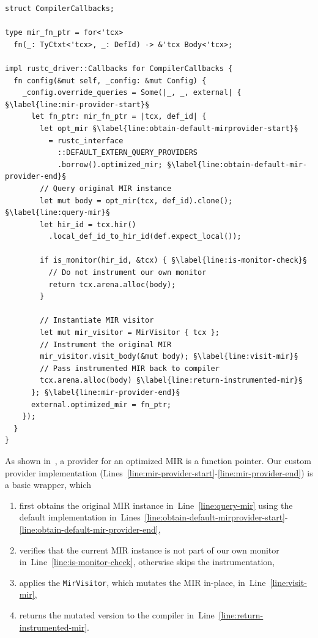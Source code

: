 \documentclass[paper=a4,%
  twoside,%
  BCOR4mm,%
  abstract=true,%
  toc=bibliography,%
  chapterprefix=true,%
  toc=bibliographynumbered,%
  open=right,%
  english,%
  pagesize=pdftex]{scrreprt}
\newcommand{\mir}{\ac{MIR}\xspace}
\begin{document}
\begin{lstlisting}[style=boxed, caption={The Rust compiler interface accepts an object which implements its callback trait, allowing us to execute code at different compilation phases}, label=lst:compiler-callbacks, escapechar=§]
struct CompilerCallbacks;

type mir_fn_ptr = for<'tcx>
  fn(_: TyCtxt<'tcx>, _: DefId) -> &'tcx Body<'tcx>;

impl rustc_driver::Callbacks for CompilerCallbacks {
  fn config(&mut self, _config: &mut Config) {
    _config.override_queries = Some(|_, _, external| { §\label{line:mir-provider-start}§
      let fn_ptr: mir_fn_ptr = |tcx, def_id| {
        let opt_mir §\label{line:obtain-default-mirprovider-start}§
          = rustc_interface
            ::DEFAULT_EXTERN_QUERY_PROVIDERS
            .borrow().optimized_mir; §\label{line:obtain-default-mir-provider-end}§
        // Query original MIR instance
        let mut body = opt_mir(tcx, def_id).clone(); §\label{line:query-mir}§
        let hir_id = tcx.hir()
          .local_def_id_to_hir_id(def.expect_local());

        if is_monitor(hir_id, &tcx) { §\label{line:is-monitor-check}§
          // Do not instrument our own monitor
          return tcx.arena.alloc(body);
        }

        // Instantiate MIR visitor
        let mut mir_visitor = MirVisitor { tcx };
        // Instrument the original MIR
        mir_visitor.visit_body(&mut body); §\label{line:visit-mir}§
        // Pass instrumented MIR back to compiler
        tcx.arena.alloc(body) §\label{line:return-instrumented-mir}§
      }; §\label{line:mir-provider-end}§
      external.optimized_mir = fn_ptr;
    });
  }
}
\end{lstlisting}

As shown in~, a provider for an optimized \mir is a function pointer. Our custom provider implementation (Lines~\ref{line:mir-provider-start}-\ref{line:mir-provider-end}) is a basic wrapper, which 
\begin{enumerate}
  \item first obtains the original \mir instance in~Line~\ref{line:query-mir} using the default implementation in~Lines~\ref{line:obtain-default-mirprovider-start}-\ref{line:obtain-default-mir-provider-end},
  \item verifies that the current \mir instance is not part of our own monitor in~Line~\ref{line:is-monitor-check}, otherwise skips the instrumentation,
  \item applies the \texttt{MirVisitor}, which mutates the \mir in-place, in~Line~\ref{line:visit-mir},
  \item returns the mutated version to the compiler in~Line~\ref{line:return-instrumented-mir}.
\end{enumerate}
\end{document}
